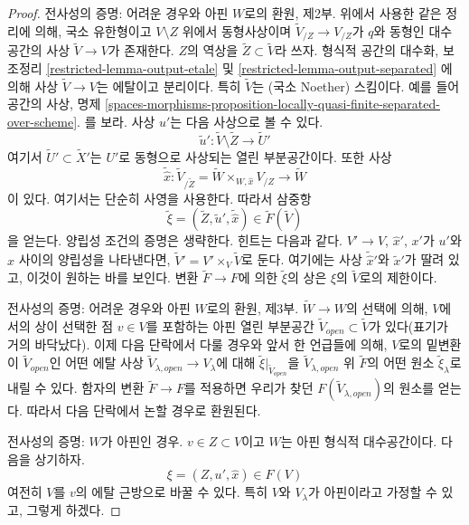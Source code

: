 \begin{proof}
\medskip\noindent
전사성의 증명: 어려운 경우와 아핀 $W$로의 환원, 제2부.
위에서 사용한 같은 정리에 의해, 국소 유한형이고
$V \setminus Z$ 위에서 동형사상이며
$\tilde V_{/Z} \to V_{/Z}$가 $q$와 동형인 대수공간의 사상
$\tilde V \to V$가 존재한다.
$Z$의 역상을 $\tilde Z \subset \tilde V$라 쓰자.
형식적 공간의 대수화, 보조정리
\ref{restricted-lemma-output-etale} 및 \ref{restricted-lemma-output-separated}
에 의해 사상 $\tilde V \to V$는 에탈이고 분리이다.
특히 $\tilde V$는 (국소 Noether) 스킴이다. 예를 들어
공간의 사상, 명제
\ref{spaces-morphisms-proposition-locally-quasi-finite-separated-over-scheme}.
를 보라. 사상 $u'$는 다음 사상으로 볼 수 있다.
$$
\tilde u' : \tilde V \setminus \tilde Z \longrightarrow \tilde U'
$$
여기서 $\tilde U' \subset \tilde X'$는 $U'$로 동형으로 사상되는
열린 부분공간이다. 또한 사상
$$
\tilde {\hat x} :
\tilde V_{/\tilde Z} = \tilde W \times_{W, \hat x} V_{/Z}
\longrightarrow
\tilde W
$$
이 있다. 여기서는 단순히 사영을 사용한다. 따라서 삼중항
$$
\tilde \xi = (\tilde Z, \tilde u', \tilde {\hat x}) \in \tilde F(\tilde V)
$$
을 얻는다. 양립성 조건의 증명은 생략한다. 힌트는 다음과 같다.
$V' \to V$, $\hat x'$, $x'$가 $u'$와 $\hat x$ 사이의 양립성을
나타낸다면, $\tilde V' = V' \times_V \tilde V$로 둔다.
여기에는 사상 $\tilde{\hat x}'$와 $\tilde x'$가 딸려 있고, 이것이
원하는 바를 보인다. 변환 $\tilde F \to F$에 의한 $\tilde \xi$의 상은
$\xi$의 $\tilde V$로의 제한이다.

\medskip\noindent
전사성의 증명: 어려운 경우와 아핀 $W$로의 환원, 제3부.
$\tilde W \to W$의 선택에 의해, $V$에서의 상이 선택한 점
$v \in V$를 포함하는 아핀 열린 부분공간
$\tilde V_{open} \subset \tilde V$가 있다(표기가 거의 바닥났다).
이제 다음 단락에서 다룰 경우와 앞서 한 언급들에 의해,
$V$로의 밑변환이 $\tilde V_{open}$인 어떤 에탈 사상
$\tilde V_{\lambda, open} \to V_\lambda$에 대해
$\tilde \xi|_{\tilde V_{open}}$을 $\tilde V_{\lambda, open}$ 위
$\tilde F$의 어떤 원소 $\tilde \xi_\lambda$로 내릴 수 있다.
함자의 변환 $\tilde F \to F$를 적용하면 우리가 찾던
$F(\tilde V_{\lambda, open})$의 원소를 얻는다.
따라서 다음 단락에서 논할 경우로 환원된다.

\medskip\noindent
전사성의 증명: $W$가 아핀인 경우. $v \in Z \subset V$이고
$W$는 아핀 형식적 대수공간이다. 다음을 상기하자.
$$
\xi = (Z, u', \hat x) \in F(V)
$$
여전히 $V$를 $v$의 에탈 근방으로 바꿀 수 있다.
특히 $V$와 $V_\lambda$가 아핀이라고 가정할 수 있고, 그렇게 하겠다.


\end{proof}
